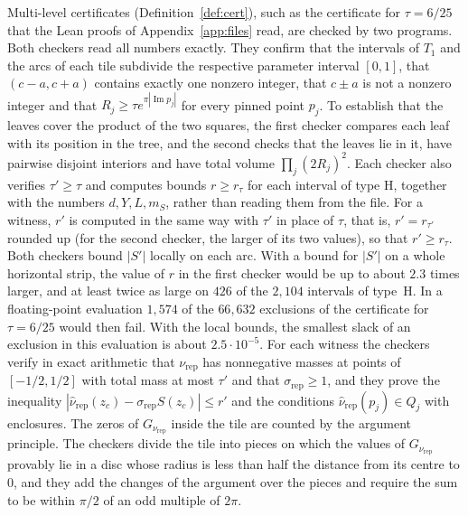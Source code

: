 \documentclass[11pt]{amsart}
\theoremstyle{definition}
\theoremstyle{remark}
\numberwithin{equation}{section}
\newcommand{\im}{\operatorname{Im}}
\newcommand{\TabLeafE}{66{,}632}
\newcommand{\StripRatio}{2.3}
\newcommand{\StripTwice}{426}
\newcommand{\StripH}{2{,}104}
\newcommand{\StripFail}{1{,}574}
\newcommand{\StripSlack}{2.5\cdot10^{-5}}
\begin{document}
Multi-level certificates (Definition~\ref{def:cert}), such as the certificate for $\tau=6/25$ that the Lean proofs of Appendix~\ref{app:files} read, are checked by two programs. Both checkers read all numbers exactly. They confirm that the intervals of $T_1$ and the arcs of each tile subdivide the respective parameter interval $[0,1]$, that $(c-a,c+a)$ contains exactly one nonzero integer, that $c\pm a$ is not a nonzero integer and that $R_j\ge\tau e^{\pi|\im p_j|}$ for every pinned point $p_j$. To establish that the leaves cover the product of the two squares, the first checker compares each leaf with its position in the tree, and the second checks that the leaves lie in it, have pairwise disjoint interiors and have total volume $\prod_j(2R_j)^2$. Each checker also verifies $\tau'\ge\tau$ and computes bounds $r\ge r_\tau$ for each interval of type H, together with the numbers $d,Y,L,m_S$, rather than reading them from the file. For a witness, $r'$ is computed in the same way with $\tau'$ in place of $\tau$, that is, $r'=r_{\tau'}$ rounded up (for the second checker, the larger of its two values), so that $r'\ge r_\tau$. Both checkers bound $|S'|$ locally on each arc. With a bound for $|S'|$ on a whole horizontal strip, the value of $r$ in the first checker would be up to about $\StripRatio$ times larger, and at least twice as large on $\StripTwice$ of the $\StripH$ intervals of type~H. In a floating-point evaluation $\StripFail$ of the $\TabLeafE$ exclusions of the certificate for $\tau=6/25$ would then fail. With the local bounds, the smallest slack of an exclusion in this evaluation is about $\StripSlack$. For each witness the checkers verify in exact arithmetic that $\nu_{\mathrm{rep}}$ has nonnegative masses at points of $[-1/2,1/2]$ with total mass at most $\tau'$ and that $\sigma_{\mathrm{rep}}\ge1$, and they prove the inequality $|\hat\nu_{\mathrm{rep}}(z_c)-\sigma_{\mathrm{rep}}S(z_c)|\le r'$ and the conditions $\hat\nu_{\mathrm{rep}}(p_j)\in Q_j$ with enclosures. The zeros of $G_{\nu_{\mathrm{rep}}}$ inside the tile are counted by the argument principle. The checkers divide the tile into pieces on which the values of $G_{\nu_{\mathrm{rep}}}$ provably lie in a disc whose radius is less than half the distance from its centre to $0$, and they add the changes of the argument over the pieces and require the sum to be within $\pi/2$ of an odd multiple of $2\pi$.
\end{document}
